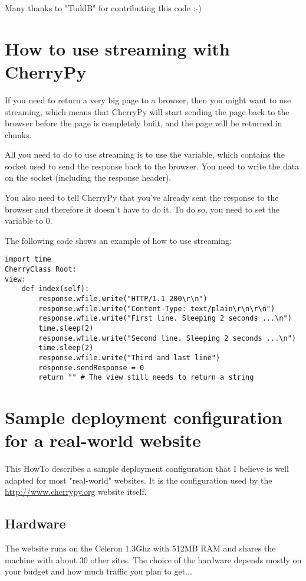 \documentclass{manual}
\begin{document}
Many thanks to "ToddB" for contributing this code :-)

\chapter{How to use streaming with CherryPy}

If you need to return a very big page to a browser, then you might want to use streaming, which means that CherryPy
will start sending the page back to the browser before the page is completely built, and the page will
be returned in chunks.

All you need to do to use streaming is to use the  variable, which contains the socket used
to send the response back to the browser. You need to write  the data on the socket (including the
response header).

You also need to tell CherryPy that you've already sent the response to the browser and therefore it doesn't have to do it.
To do so, you need to set the  variable to 0.

The following code shows an example of how to use streaming:
\begin{verbatim}
import time
CherryClass Root:
view:
    def index(self):
        response.wfile.write("HTTP/1.1 200\r\n")
        response.wfile.write("Content-Type: text/plain\r\n\r\n")
        response.wfile.write("First line. Sleeping 2 seconds ...\n")
        time.sleep(2)
        response.wfile.write("Second line. Sleeping 2 seconds ...\n")
        time.sleep(2)
        response.wfile.write("Third and last line")
        response.sendResponse = 0
        return "" # The view still needs to return a string
\end{verbatim}

\chapter{Sample deployment configuration for a real-world website}

This HowTo describes a sample deployment configuration that I believe is well adapted for most "real-world" websites.
It is the configuration used by the \url{http://www.cherrypy.org} website itself.

\section{Hardware}
The website runs on the Celeron 1.3Ghz with 512MB RAM and shares the machine with about 30 other sites.
The choice of the hardware depends mostly on your budget and how much traffic you plan to get...
\end{document}
